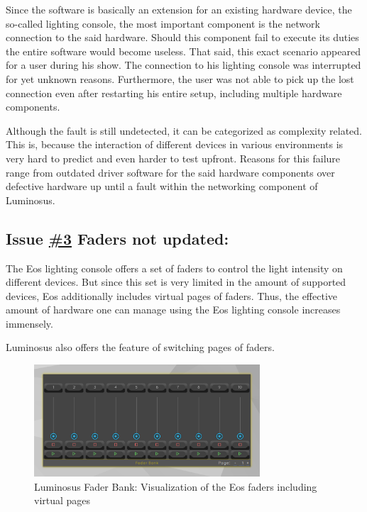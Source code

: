 \documentclass{scrreprt}
\begin{document}
Since the software is basically an extension for an existing hardware device, the so-called lighting console, the most important component is the network connection to the said hardware. Should this component fail to execute its duties the entire software would become useless.
That said, this exact scenario appeared for a user during his show. The connection to his lighting console was interrupted for yet unknown reasons. Furthermore, the user was not able to pick up the lost connection even after restarting his entire setup, including multiple hardware components.

Although the fault is still undetected, it can be categorized as complexity related. This is, because the interaction of different devices in various environments is very hard to predict and even harder to test upfront. Reasons for this failure range from outdated driver software for the said hardware components over defective hardware up until a fault within the networking component of Luminosus.

\subsection{Issue \href{https://github.com/ETCLabs/LuminosusEosEdition/issues/3}{\#3} Faders not updated:}

The Eos lighting console offers a set of faders to control the light intensity on different devices. But since this set is very limited in the amount of supported devices, Eos additionally includes virtual pages of faders. Thus, the effective amount of hardware one can manage using the Eos lighting console increases immensely.

Luminosus also offers the feature of switching pages of faders. 

\begin{figure}[H]
	\centering
	\includegraphics[width=0.75\textwidth]{img/luminosus_faders}
	\caption[Luminosus Fader Bank]{Luminosus Fader Bank: Visualization of the Eos faders including virtual pages}
	\label{fig:luminosus_faders}
\end{figure}
\end{document}
